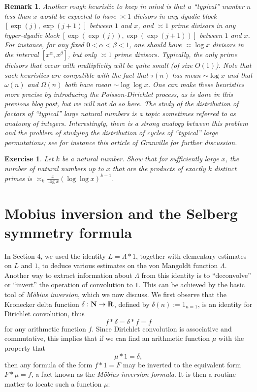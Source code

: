 \documentclass[10pt,reqno]{amsart}
\newtheorem{exercise}[theorem]{Exercise}
\newtheorem{remark}[theorem]{Remark}
\begin{document}
\begin{remark}
    Another rough heuristic to keep in mind is that a “typical” number $n$ less than $x$ would be expected to have $\asymp 1$ divisors in any dyadic block $[\exp(j), \exp(j+1)]$ between $1$ and $x$, and $\asymp 1$ prime divisors in any hyper-dyadic block $[\exp(\exp(j)), \exp(\exp(j+1))]$ between $1$ and $x$. For instance, for any fixed $0 < \alpha < \beta < 1$, one should have $\asymp \log x$ divisors in the interval $[x^\alpha, x^\beta]$, but only $\asymp 1$ prime divisors. Typically, the only prime divisors that occur with multiplicity will be quite small (of size $O(1)$). Note that such heuristics are compatible with the fact that $\tau(n)$ has mean $\sim \log x$ and that $\omega(n)$ and $\Omega(n)$ both have mean $\sim \log\log x$. One can make these heuristics more precise by introducing the Poisson-Dirichlet process, as is done in \emph{this previous blog post}, but we will not do so here. The study of the distribution of factors of “typical” large natural numbers is a topic sometimes referred to as \emph{anatomy of integers}. Interestingly, there is a strong analogy between this problem and the problem of studying the distribution of cycles of “typical” large permutations; see for instance \emph{this article of Granville} for further discussion.
\end{remark}

\begin{exercise}
    Let $k$ be a natural number. Show that for sufficiently large $x$, the number of natural numbers up to $x$ that are the products of exactly $k$ distinct primes is $\asymp_k \frac{x}{\log x} (\log\log x)^{k-1}$.
\end{exercise}

\section{Mobius inversion and the Selberg symmetry formula}

In Section 4, we used the identity $L = \Lambda * 1$, together with elementary estimates on $L$ and $1$, to deduce various estimates on the von Mangoldt function $\Lambda$. Another way to extract information about $\Lambda$ from this identity is to “deconvolve” or “invert” the operation of convolution to $1$. This can be achieved by the basic tool of \emph{Möbius inversion}, which we now discuss. We first observe that the Kronecker delta function $\delta: {\bf N} \rightarrow {\bf R}$, defined by $\delta(n) := 1_{n=1}$, is an identity for Dirichlet convolution, thus
%
\[  f * \delta = \delta * f = f\]
%
for any arithmetic function $f$. Since Dirichlet convolution is associative and commutative, this implies that if we can find an arithmetic function $\mu$ with the property that
%
\begin{equation}   \mu * 1 = \delta, \end{equation}
%
then any formula of the form $f * 1 = F$ may be inverted to the equivalent form $F * \mu = f$, a fact known as the \emph{Möbius inversion formula}. It is then a routine matter to locate such a function $\mu$:
\end{document}
